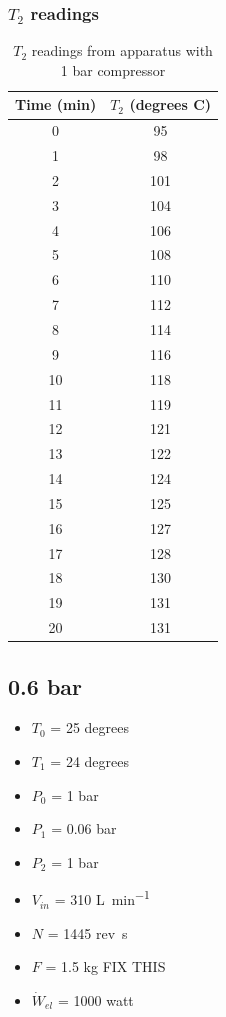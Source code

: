 \documentclass[class=article, crop=false, 12pt,a4paper]{standalone}
\begin{document}
\subsubsection{\(T_2\) readings} 
\begin{table}
  \centering
    \begin{tabular}{|c|c|}
      \hline
      Time (\si{\minute}) & \(T_2\) (degrees C)\\
      \hline
      0 & 95\\
      1 & 98\\
      2 & 101\\
      3 & 104\\
      4 & 106\\
      5 & 108\\
      6 & 110\\
      7 & 112\\
      8 & 114\\
      9 & 116\\
      10 & 118\\
      11 & 119\\
      12 & 121\\
      13 & 122\\
      14 & 124\\
      15 & 125\\
      16 & 127\\
      17 & 128\\
      18 & 130\\
      19 & 131\\
      20 & 131\\
      \hline
    \end{tabular}
  \caption{\(T_2\) readings from apparatus with 1 bar compressor}
  \label{table:1}
\end{table}
\subsection{0.6 bar}
\begin{multicols}{2}
  \begin{itemize}[noitemsep]
    \item \(T_0\) = 25 degrees
    \item \(T_1\) = 24 degrees
    \item \(P_0\) = 1 \si{\bar}
    \item \(P_1\) = 0.06 \si{\bar}
    \item \(P_2\) = 1 \si{\bar}
    \item \(V_{in}\) = 310 \si{\liter\per\minute}
    \item \(N\) = 1445 rev\si{\per\second}
    \item \(F\) = 1.5 \si{\kilogram} FIX THIS
    \item \(\dot{W}_{el}\) = 1000 \si{watt}
  \end{itemize}
\end{multicols}
\end{document}

